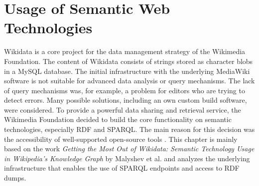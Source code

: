 ﻿\documentclass[11pt,titlepage,oneside,openany]{book}
\begin{document}
\chapter{Usage of Semantic Web Technologies}
\label{chap:semwebtech}
Wikidata is a core project for the data management strategy of the Wikimedia Foundation. The content of Wikidata consists of strings stored as character blobs in a MySQL database. The initial infrastructure with the underlying MediaWiki software is not suitable for advanced data analysis or query mechanisms. The lack of query mechanisms was, for example, a problem for editors who are trying to detect errors. Many possible solutions, including an own custom build software, were considered. To provide a powerful data sharing and retrieval service, the Wikimedia Foundation decided to build the core functionality on semantic technologies, especially RDF and SPARQL. The main reason for this decision was the accessibility of well-supported open-source tools \cite{Malyshev2018GettingTM}. This chapter is mainly based on the work \textit{Getting the Most Out of Wikidata: Semantic Technology Usage in Wikipedia's Knowledge Graph} by Malyshev et al. \cite{Malyshev2018GettingTM} and analyzes the underlying infrastructure that enables the use of SPARQL endpoints and access to RDF dumps.
\\
\\
\end{document}
